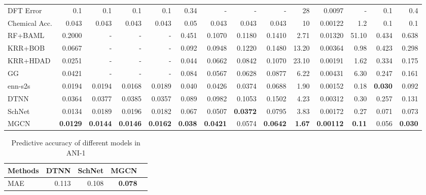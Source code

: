 \documentclass[letterpaper]{article} \usepackage{bm}
\begin{document}
\begin{table*}[tbp]
\begin{threeparttable}
{\begin{tabular}{lrrrrrrrrrrrrr}
    
    DFT Error & 0.1    & 0.1    & 0.1    & 0.1    & 0.34   & -      & -      & -      & 28     & 0.0097 & -      & 0.1    & 0.4 \\
    Chemical Acc. & 0.043  & 0.043  & 0.043  & 0.043  & 0.05   & 0.043  & 0.043  & 0.043  & 10     & 0.00122 & 1.2    & 0.1    & 0.1 \\
    \midrule
    \midrule
    RF+BAML & 0.2000  & -      & -      & -      & 0.451  & 0.1070  & 0.1180  & 0.1410  & 2.71   & 0.01320  & 51.10  & 0.434  & 0.638  \\
    KRR+BOB & 0.0667  & -      & -      & -      & 0.092  & 0.0948  & 0.1220  & 0.1480  & 13.20  & 0.00364  & 0.98   & 0.423  & 0.298  \\
    KRR+HDAD & 0.0251  & -      & -      & -      & 0.044  & 0.0662  & 0.0842  & 0.1070  & 23.10  & 0.00191  & 1.62   & 0.334  & 0.175  \\
    GG     & 0.0421  & -      & -      & -      & 0.084  & 0.0567  & 0.0628  & 0.0877  & 6.22   & 0.00431  & 6.30   & 0.247  & 0.161  \\
    enn-s2s & 0.0194  & 0.0194 & 0.0168 & 0.0189 & 0.040  & 0.0426  & 0.0374 & 0.0688 & 1.90   & 0.00152  & 0.18   & \textbf{0.030} & 0.092  \\
    DTNN   & 0.0364  & 0.0377 & 0.0385 & 0.0357 & 0.089  & 0.0982  & 0.1053  & 0.1502  & 4.23   & 0.00312  & 0.30   & 0.257  & 0.131 \\
    SchNet & 0.0134  & 0.0189 & 0.0196 & 0.0182 & 0.067  & 0.0507  & \textbf{0.0372}  & 0.0795  & 3.83   & 0.00172  & 0.27   & 0.071  & 0.073  \\
    MGCN   & \textbf{0.0129} & \textbf{0.0144} & \textbf{0.0146} & \textbf{0.0162} & \textbf{0.038} & \textbf{0.0421} & 0.0574  & \textbf{0.0642}&\textbf{1.67} & \textbf{0.00112} & \textbf{0.11} & 0.056  & \textbf{0.030}  \\
    \bottomrule
    
    \end{tabular}}


\end{threeparttable} 


\label{qm9}\end{table*}

\begin{table}[htbp]
  \centering
  \caption{Predictive accuracy of different models in ANI-1}
    \begin{tabular}{lrrrr}
    \toprule
    Methods & \multicolumn{1}{l}{DTNN} & \multicolumn{1}{l}{SchNet} & \multicolumn{1}{l}{MGCN}  \\
    \midrule
    
    MAE    & 0.113  & 0.108   & \textbf{0.078} \\
    \bottomrule
    \end{tabular}\label{ani}\end{table}
\end{document}
